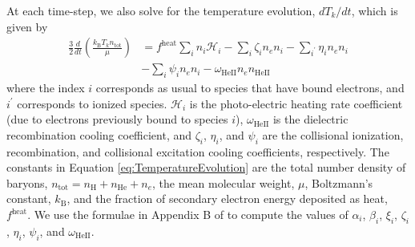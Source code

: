 \documentclass[letterpaper,titlepage,12pt]{article}
\numberwithin{equation}{section}
\newcommand{\HeII}{\text{HeII}}
\newcommand{\nHeII}{n_{\text{HeII}}}
\newcommand{\ntot}{n_{\text{tot}}}
\newcommand{\kB}{k_{\text{B}}}
\newcommand{\fheat}{f^{\text{heat}}}
\newcommand{\Heat}{\mathcal{H}}
\begin{document}
At each time-step, we also solve for the temperature evolution, $dT_k/dt$,
which
is given by
\begin{align}
    \frac{3}{2}\frac{d}{dt}\left(\frac{\kB T_k \ntot}{\mu}\right) & = \fheat  \sum_i n_i \Heat_i - \sum_i \zeta_i n_e n_i - \sum_{i^{\prime}} \eta_i n_e n_i \nonumber \\ & - \sum_i \psi_i n_e n_i - \omega_{\HeII} n_e \nHeII \label{eq:TemperatureEvolution} 
\end{align}
where the index $i$ corresponds as usual to species that have bound electrons,
and $i^{\prime}$ corresponds to ionized species. $\Heat_i$ is the
photo-electric heating rate coefficient (due to electrons previously bound to
species $i$), $\omega_{\HeII}$ is the dielectric recombination cooling
coefficient, and $\zeta_i$, $\eta_i$, and $\psi_i$ are the collisional
ionization, recombination, and collisional excitation cooling coefficients,
respectively. The constants in Equation \ref{eq:TemperatureEvolution} are the
total number density of baryons, $\ntot = n_\mathrm{H} + n_{\mathrm{He}} +
n_e$, the mean molecular weight, $\mu$, Boltzmann's constant, $\kB$, and the
fraction of secondary electron energy deposited as heat, $\fheat$. We use the
formulae in Appendix B of \citet{Fukugita1994} to compute the values of
$\alpha_i$, $\beta_i$, $\xi_i$, $\zeta_i$, $\eta_i$, $\psi_i$, and
$\omega_{\HeII}$.

\end{document}
